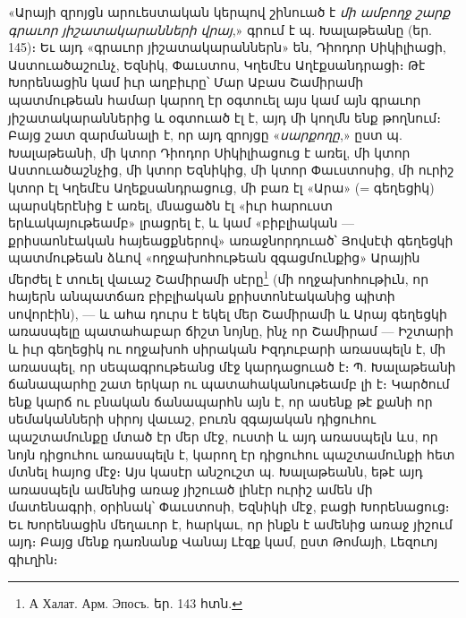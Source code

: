 \documentclass{article}
\begin{document}
{«Արայի զրոյցն արուեստական կերպով շինուած է \emph{մի ամբողջ շարք գրաւոր յիշատակարանների վրայ},» գրում է պ. Խալաթեանը (եր. 145)։ Եւ այդ «գրաւոր յիշատակարաններն» են, Դիոդոր Սիկիլիացի, Աստուածաշունչ, Եզնիկ, Փաւստոս, Կղեմէս Աղէքսանդրացի։ Թէ Խորենացին կամ իւր աղբիւրը՝ Մար Աբաս Շամիրամի պատմութեան համար կարող էր օգտուել այս կամ այն գրաւոր յիշատակարաններից և օգտուած էլ է, այդ մի կողմն ենք թողնում։ Բայց շատ զարմանալի է, որ այդ զրոյցը «\emph{սարքողը},» ըստ պ. Խալաթեանի, մի կտոր Դիոդոր Սիկիլիացուց է առել, մի կտոր Աստուածաշնչից, մի կտոր Եզնիկից, մի կտոր Փաւստոսից, մի ուրիշ կտոր էլ Կղեմէս Աղեքսանդրացուց, մի բառ էլ «Արա» (= գեղեցիկ) պարսկերէնից է առել, մնացածն էլ «իւր հարուստ երևակայութեամբ» լրացրել է, և կամ «բիբլիական — քրիսաոնէական հայեացքներով» առաջնորդուած՝ Յովսէփ գեղեցկի պատմութեան ձևով «ողջախոհութեան զգացմունքից» Արային մերժել է տուել վաւաշ Շամիրամի սէրը\footnote{А Халат. Арм. Эпосъ. եր. 143 հտն.} (մի ողջախոհութիւն, որ հայերն անպատճառ բիբլիական քրիստոնէականից պիտի սովորէին), — և ահա դուրս է եկել մեր Շամիրամի և Արայ գեղեցկի առասպելը պատահաբար ճիշտ նոյնը, ինչ որ Շամիրամ — Իշտարի և իւր գեղեցիկ ու ողջախոհ սիրական Իզդուբարի առասպելն է, մի առասպել, որ սեպագրութեանց մէջ կարդացուած է։ Պ. Խալաթեանի ճանապարհը շատ երկար ու պատահականութեամբ լի է։ Կարծում ենք կարճ ու բնական ճանապարհն այն է, որ ասենք թէ քանի որ սեմականների սիրոյ վաւաշ, բուռն զգայական դիցուհու պաշտամունքը մտած էր մեր մէջ, ուստի և այդ առասպելն ևս, որ նոյն դիցուհու առասպելն է, կարող էր դիցուհու պաշտամունքի հետ մտնել հայոց մէջ։ Այս կասէր անշուշտ պ. Խալաթեանն, եթէ այդ առասպելն ամենից առաջ յիշուած լինէր ուրիշ ամեն մի մատենագրի, օրինակ՝ Փաւստոսի, Եզնիկի մէջ, բացի Խորենացուց։ Եւ Խորենացին մեղաւոր է, հարկաւ, որ ինքն է ամենից առաջ յիշում այդ։ Բայց մենք դառնանք Վանայ Լէզք կամ, ըստ Թոմայի, Լեզուոյ գիւղին։

}
\end{document}
